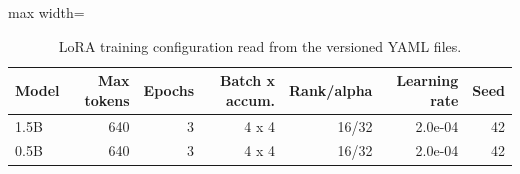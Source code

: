\begin{table}[t]
\centering
\caption{LoRA training configuration read from the versioned YAML files.}
\label{tab:hyperparameters}
\begin{adjustbox}{max width=\columnwidth}
\begin{tabular}{lrrrrrr}
\toprule
Model & Max tokens & Epochs & Batch x accum. & Rank/alpha & Learning rate & Seed \\
\midrule
1.5B & 640 & 3 & 4 x 4 & 16/32 & 2.0e-04 & 42 \\
0.5B & 640 & 3 & 4 x 4 & 16/32 & 2.0e-04 & 42 \\
\bottomrule
\end{tabular}
\end{adjustbox}
\end{table}
